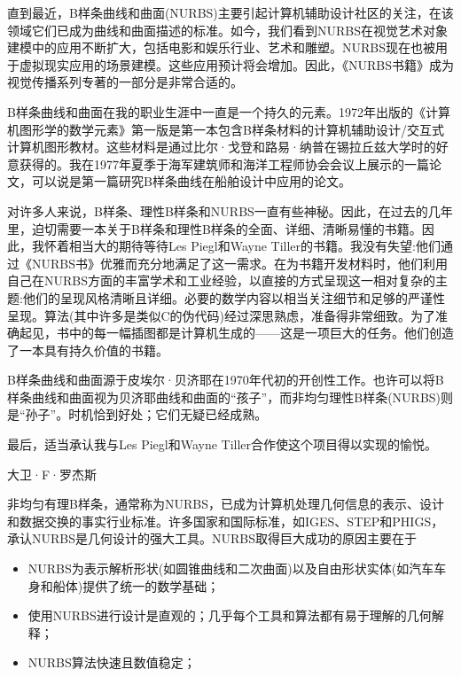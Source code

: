 \documentclass[main.tex]{subfiles}
\begin{document}
直到最近，B样条曲线和曲面(NURBS)主要引起计算机辅助设计社区的关注，在该领域它们已成为曲线和曲面描述的标准。如今，我们看到NURBS在视觉艺术对象建模中的应用不断扩大，包括电影和娱乐行业、艺术和雕塑。NURBS现在也被用于虚拟现实应用的场景建模。这些应用预计将会增加。因此，《NURBS书籍》成为视觉传播系列专著的一部分是非常合适的。

B样条曲线和曲面在我的职业生涯中一直是一个持久的元素。1972年出版的《计算机图形学的数学元素》第一版是第一本包含B样条材料的计算机辅助设计/交互式计算机图形教材。这些材料是通过比尔·戈登和路易·纳普在锡拉丘兹大学时的好意获得的。我在1977年夏季于海军建筑师和海洋工程师协会会议上展示的一篇论文，可以说是第一篇研究B样条曲线在船舶设计中应用的论文。

对许多人来说，B样条、理性B样条和NURBS一直有些神秘。因此，在过去的几年里，迫切需要一本关于B样条和理性B样条的全面、详细、清晰易懂的书籍。因此，我怀着相当大的期待等待Les Piegl和Wayne Tiller的书籍。我没有失望:他们通过《NURBS书》优雅而充分地满足了这一需求。在为书籍开发材料时，他们利用自己在NURBS方面的丰富学术和工业经验，以直接的方式呈现这一相对复杂的主题:他们的呈现风格清晰且详细。必要的数学内容以相当关注细节和足够的严谨性呈现。算法(其中许多是类似C的伪代码)经过深思熟虑，准备得非常细致。为了准确起见，书中的每一幅插图都是计算机生成的——这是一项巨大的任务。他们创造了一本具有持久价值的书籍。

B样条曲线和曲面源于皮埃尔·贝济耶在1970年代初的开创性工作。也许可以将B样条曲线和曲面视为贝济耶曲线和曲面的“孩子”，而非均匀理性B样条(NURBS)则是“孙子”。时机恰到好处；它们无疑已经成熟。

最后，适当承认我与Les Piegl和Wayne Tiller合作使这个项目得以实现的愉悦。

大卫·F·罗杰斯

非均匀有理B样条，通常称为NURBS，已成为计算机处理几何信息的表示、设计和数据交换的事实行业标准。许多国家和国际标准，如IGES、STEP和PHIGS，承认NURBS是几何设计的强大工具。NURBS取得巨大成功的原因主要在于

\begin{itemize}
\item NURBS为表示解析形状(如圆锥曲线和二次曲面)以及自由形状实体(如汽车车身和船体)提供了统一的数学基础；
\end{itemize}

\begin{itemize}
\item 使用NURBS进行设计是直观的；几乎每个工具和算法都有易于理解的几何解释；
\end{itemize}

\begin{itemize}
\item NURBS算法快速且数值稳定；
\end{itemize}
\end{document}
